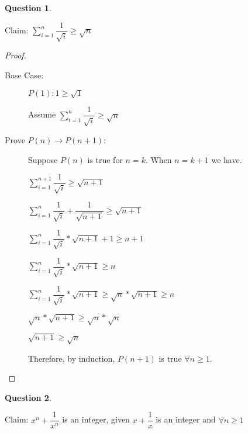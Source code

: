 \documentclass[11pt, oneside]{article}   	%
\newtheorem{Question}{Question}
\begin{document}
\begin{Question} %
\end{Question}

Claim: $\sum_{i=1}^n \dfrac{1}{\sqrt{i}} \geq \sqrt{n}$

\begin{proof}
\begin{description}
\item[Base Case:] $P(1): 1 \geq \sqrt{1}$

Assume $\sum_{i=1}^n \dfrac{1}{\sqrt{i}} \geq \sqrt{n}$

\item[Prove $P(n) \rightarrow P(n+1)$:] Suppose $P(n)$ is true for $n=k$. When $n=k+1$ we have.

$\sum_{i=1}^{n+1} \dfrac{1}{\sqrt{i} } \geq \sqrt{n+1}$

$\sum_{i=1}^{n} \dfrac{1}{\sqrt{i}} + \dfrac{1}{\sqrt{n+1}} \geq \sqrt{n+1}$

$\sum_{i=1}^{n} \dfrac{1}{\sqrt{i}} * \sqrt{n+1} + 1 \geq n+1$

$\sum_{i=1}^{n} \dfrac{1}{\sqrt{i}} * \sqrt{n+1} \geq n$

$\sum_{i=1}^{n} \dfrac{1}{\sqrt{i}} * \sqrt{n+1} \geq \sqrt{n} * \sqrt{n+1} \geq n$ %

$\sqrt{n} * \sqrt{n+1} \geq \sqrt{n} * \sqrt{n}$

$\sqrt{n+1} \geq \sqrt{n}$


Therefore, by induction, $P(n+1)$ is true $\forall n \geq 1$.
\end{description}
\end{proof}


\begin{Question} %
\end{Question}

Claim: $x^n + \dfrac{1}{x^n}$ is an integer, given $x+\dfrac{1}{x}$ is an integer and $\forall n \geq 1$
\end{document}
